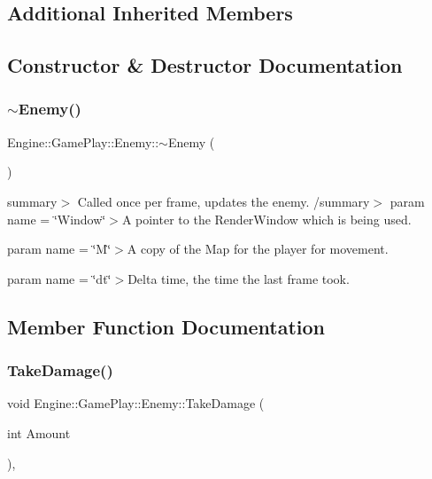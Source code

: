 \subsection*{Additional Inherited Members}


\subsection{Constructor \& Destructor Documentation}
\mbox{\label{class_engine_1_1_game_play_1_1_enemy_a4fc3aafb331e8cf852ea31bcc63940ff}} 
\subsubsection{\texorpdfstring{$\sim$\+Enemy()}{~Enemy()}}
{\footnotesize\ttfamily Engine\+::\+Game\+Play\+::\+Enemy\+::$\sim$\+Enemy (\begin{DoxyParamCaption}{ }\end{DoxyParamCaption})}

summary$>$ Called once per frame, updates the enemy. /summary$>$ param name = \char`\"{}\+Window\char`\"{}$>$A pointer to the Render\+Window which is being used.

param name = \char`\"{}\+M\char`\"{}$>$A copy of the Map for the player for movement.

param name = \char`\"{}dt\char`\"{}$>$Delta time, the time the last frame took.

\subsection{Member Function Documentation}
\mbox{\label{class_engine_1_1_game_play_1_1_enemy_a0eec9ea5a61636db10b5f02f9e74189a}} 
\subsubsection{\texorpdfstring{Take\+Damage()}{TakeDamage()}}
{\footnotesize\ttfamily void Engine\+::\+Game\+Play\+::\+Enemy\+::\+Take\+Damage (\begin{DoxyParamCaption}\item[{int}]{Amount }\end{DoxyParamCaption})\hspace{0.3cm}{\ttfamily [override]}, {\ttfamily [virtual]}}

